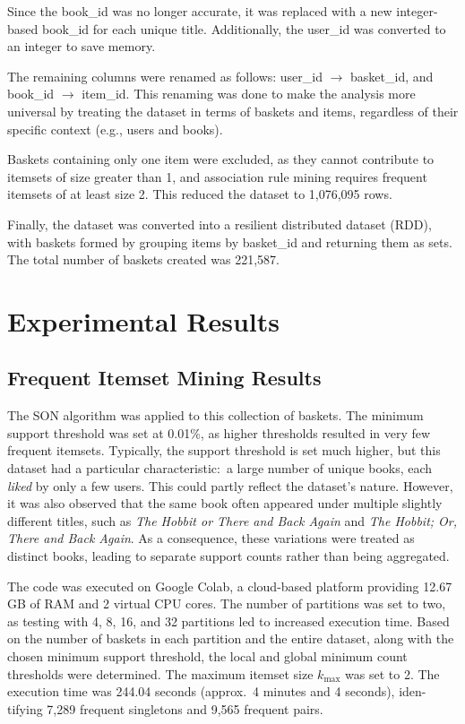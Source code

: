 \documentclass{Class/julia}
\begin{document}
Since the book\_id was no longer accurate, it was replaced with a new integer-based book\_id for each unique title. Additionally, the user\_id was converted to an integer to save memory.

The remaining columns were renamed as follows: user\_id $\rightarrow$ basket\_id, and book\_id $\rightarrow$ item\_id. This renaming was done to make the analysis more universal by treating the dataset in terms of baskets and items, regardless of their specific context (e.g., users and books).

Baskets containing only one item were excluded, as they cannot contribute to itemsets of size greater than 1, and association rule mining requires frequent itemsets of at least size 2. This reduced the dataset to 1,076,095 rows.

Finally, the dataset was converted into a resilient distributed dataset (RDD), with baskets formed by grouping items by basket\_id and returning them as sets. The total number of baskets created was 221,587.
 
\section{Experimental Results}\label{sec:4}

\subsection{Frequent Itemset Mining Results}

The SON algorithm was applied to this collection of baskets. The minimum support threshold was set at 0.01\%, as higher thresholds resulted in very few frequent itemsets. Typically, the support threshold is set much higher, but this dataset had a particular characteristic:\ a large number of unique books, each \textit{liked} by only a few users. This could partly reflect the dataset's nature. However, it was also observed that the same book often appeared under multiple slightly different titles, such as \textit{The Hobbit or There and Back Again} and \textit{The Hobbit; Or, There and Back Again}. As a consequence, these variations were treated as distinct books, leading to separate support counts rather than being aggregated.

The code was executed on Google Colab, a cloud-based platform providing 12.67 GB of RAM and 2 virtual CPU cores. The number of partitions was set to two, as testing with 4, 8, 16, and 32 partitions led to increased execution time. Based on the number of baskets in each partition and the entire dataset, along with the chosen minimum support threshold, the local and global minimum count thresholds were determined. The maximum itemset size \( k_{\max} \) was set to 2. The execution time was 244.04 seconds (approx.\ 4 minutes and 4 seconds), iden- tifying 7,289 frequent singletons and 9,565 frequent pairs.
\end{document}
